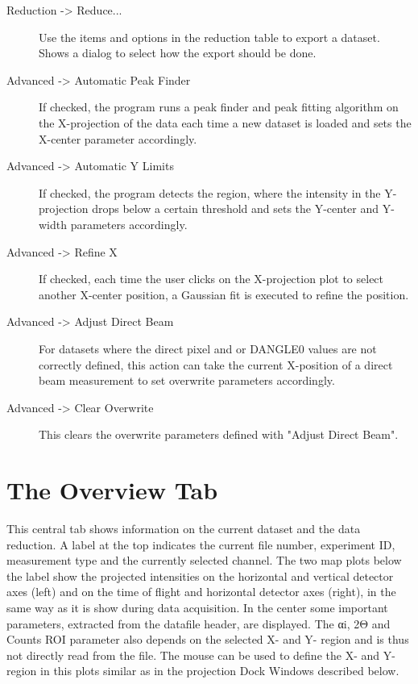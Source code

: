 \begin{description}
    \item[{ Reduction -> Reduce...}] Use the items and options in the reduction table to export a dataset. Shows a dialog to select how the export should be done.

   \item[{ Advanced -> Automatic Peak Finder}] If checked, the program runs a peak finder and peak fitting algorithm on the X-projection of the data each time a new dataset is loaded and sets the X-center parameter accordingly.
   \item[{ Advanced -> Automatic Y Limits}] If checked, the program detects the region, where the intensity in the Y-projection drops below a certain threshold and sets the Y-center and Y-width parameters accordingly.
   \item[{ Advanced -> Refine X}] If checked, each time the user clicks on the X-projection plot to select another X-center position, a Gaussian fit is executed to refine the position.
   \item[{ Advanced -> Adjust Direct Beam}] For datasets where the direct pixel and or DANGLE0 values are not correctly defined, this action can take the current X-position of a direct beam measurement to set overwrite parameters accordingly.
   \item[{ Advanced -> Clear Overwrite}] This clears the overwrite parameters defined with "Adjust Direct Beam".
  \end{description}

\section{The Overview Tab}
  This central tab shows information on the current dataset and the data reduction. A label at the top indicates the current file number, experiment ID, measurement type and the currently selected channel.
  The two map plots below the label show the projected intensities on the horizontal and vertical detector axes (left) and on the time of flight and horizontal detector axes (right), in the same way as it is show during data acquisition.
  In the center some important parameters, extracted from the datafile header, are displayed. The αi, 2Θ and Counts ROI parameter also depends on the selected X- and Y- region and is thus not directly read from the file.
  The mouse can be used to define the X- and Y-region in this plots similar as in the projection Dock Windows described below.
  
